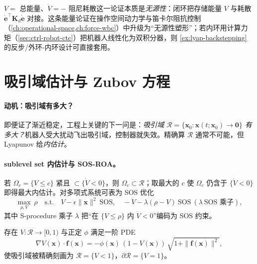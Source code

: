 \begin{insight}
$V=$ 总能量、$\dot V=-$ 阻尼耗散这一论证本质是\emph{无源性}：闭环把存储能量 $V$ 与耗散 $\dot{\mathbf{e}}^\top\mathbf{K}_d\dot{\mathbf{e}}$ 对接。这条能量论证在操作空间动力学与笛卡尔阻抗控制（\cref{ch:operational-space,ch:force-wbc}）中升级为“无源性塑形”；若内环用计算力矩（\cref{sec:ctrl-robot-ctc}）把机器人线性化为双积分器，则 \cref{ex:lyap-backstepping} 的反步/外环-内环设计可直接套用。
\end{insight}

\section{吸引域估计与 Zubov 方程}
\label{sec:lyap-roa}

\paragraph{动机：吸引域有多大？}
即便证了渐近稳定，工程上关键的下一问是：\emph{吸引域 $\mathcal{R}=\{\mathbf{x}_0:\mathbf{x}(t;\mathbf{x}_0)\to\mathbf{0}\}$ 有多大？}机器人受大扰动飞出吸引域，控制器就失效。精确算 $\mathcal{R}$ 通常不可能，但 Lyapunov 给\emph{内估计}。

\paragraph{sublevel set 内估计与 SOS-ROA。}
若 $\Omega_c=\{V\le c\}$ 紧且 $\subset\{\dot V<0\}$，则 $\Omega_c\subset\mathcal{R}$；取最大的 $c$ 使 $\Omega_c$ 仍含于 $\{\dot V<0\}$ 即得最大内估计。对多项式系统可表为 SOS 优化
\begin{equation}
  \max_{\rho,V}\ \rho\quad\text{s.t.}\quad V-\epsilon\|\mathbf{x}\|^2\ \text{SOS},\quad -\dot V-\lambda(\rho-V)\ \text{SOS}\ (\lambda\ \text{SOS 乘子}),
  \label{eq:lyap-sos-roa}
\end{equation}
其中 S-procedure 乘子 $\lambda$ 把“在 $\{V\le\rho\}$ 内 $\dot V<0$”编码为 SOS 约束。

\begin{theorem}
\label{thm:lyap-zubov}
存在 $V:\mathcal{R}\to[0,1)$ 与正定 $\phi$ 满足一阶 PDE
\begin{equation}
  \nabla V(\mathbf{x})\cdot\mathbf{f}(\mathbf{x})=-\phi(\mathbf{x})\,(1-V(\mathbf{x}))\,\sqrt{1+\|\mathbf{f}(\mathbf{x})\|^2},
  \label{eq:lyap-zubov}
\end{equation}
使吸引域被精确刻画为 $\mathcal{R}=\{V<1\}$，$\partial\mathcal{R}=\{V=1\}$\cite{zubov1964methods}。
\end{theorem}

